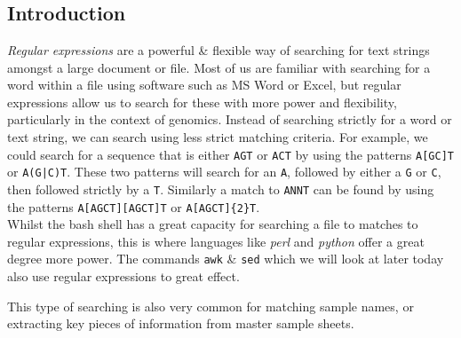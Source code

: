 
\chapter{\moduleTitle}
\newpage

\section{Introduction}
\textit{Regular expressions} are a powerful \& flexible way of searching for text strings amongst a large document or file.
Most of us are familiar with searching for a word within a file using software such as MS Word or Excel, but regular expressions allow us to search for these with more power and flexibility, particularly in the context of genomics.
Instead of searching strictly for a word or text string, we can search using less strict matching criteria.
For example, we could search for a sequence that is either \texttt{AGT} or \texttt{ACT} by using the patterns  \texttt{A[GC]T} or  \texttt{A(G|C)T}.
These two patterns will search for an  \texttt{A}, followed by either a  \texttt{G} or  \texttt{C}, then followed strictly by a  \texttt{T}.
Similarly a match to \texttt{ANNT} can be found by using the patterns \texttt{A[AGCT][AGCT]T} or  \texttt{A[AGCT]\{2\}T}. \\

Whilst the bash shell has a great capacity for searching a file to matches to regular expressions, this is where languages like \textit{perl} and \textit{python} offer a great degree more power.
The commands \texttt{awk} \& \texttt{sed} which we will look at later today also use regular expressions to great effect.

This type of searching is also very common for matching sample names, or extracting key pieces of information from master sample sheets.

